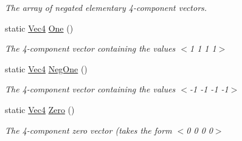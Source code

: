 \begin{DoxyCompactItemize}
\begin{DoxyCompactList}\small\item\em The array of negated elementary 4-\/component vectors. \end{DoxyCompactList}\item 
\hypertarget{classgofxmath_1_1_vec4_a6ff0bb8ed1e4276cab58b3b643bcafdc}{}static \hyperlink{classgofxmath_1_1_vec4}{Vec4} \hyperlink{classgofxmath_1_1_vec4_a6ff0bb8ed1e4276cab58b3b643bcafdc}{One} ()\label{classgofxmath_1_1_vec4_a6ff0bb8ed1e4276cab58b3b643bcafdc}

\begin{DoxyCompactList}\small\item\em The 4-\/component vector containing the values $<$1 1 1 1$>$ \end{DoxyCompactList}\item 
\hypertarget{classgofxmath_1_1_vec4_a50461f47e3461465e1c6ac831b1d0c65}{}static \hyperlink{classgofxmath_1_1_vec4}{Vec4} \hyperlink{classgofxmath_1_1_vec4_a50461f47e3461465e1c6ac831b1d0c65}{Neg\+One} ()\label{classgofxmath_1_1_vec4_a50461f47e3461465e1c6ac831b1d0c65}

\begin{DoxyCompactList}\small\item\em The 4-\/component vector containing the values $<$-\/1 -\/1 -\/1 -\/1$>$ \end{DoxyCompactList}\item 
\hypertarget{classgofxmath_1_1_vec4_a3e7809a906b5a35a7ede27f839550f1a}{}static \hyperlink{classgofxmath_1_1_vec4}{Vec4} \hyperlink{classgofxmath_1_1_vec4_a3e7809a906b5a35a7ede27f839550f1a}{Zero} ()\label{classgofxmath_1_1_vec4_a3e7809a906b5a35a7ede27f839550f1a}

\begin{DoxyCompactList}\small\item\em The 4-\/component zero vector (takes the form $<$0 0 0 0$>$ \end{DoxyCompactList}\end{DoxyCompactItemize}
